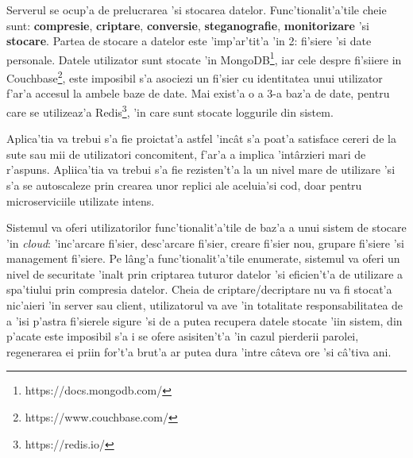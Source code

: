 \documentclass[12pt,a4paper,twoside]{report}
\begin{document}
Serverul se ocup'a de prelucrarea 'si stocarea datelor. Func'tionalit'a'tile cheie sunt: \textbf{compresie}, \textbf{criptare}, \textbf{conversie}, \textbf{steganografie}, \textbf{monitorizare} 'si \textbf{stocare}. Partea de stocare a datelor este 'imp'ar'tit'a 'in 2: fi'siere 'si date personale. Datele utilizator sunt stocate 'in MongoDB\footnote{https://docs.mongodb.com/}, iar cele despre fi'siiere in Couchbase\footnote{https://www.couchbase.com/}, este imposibil s'a asociezi un fi'sier cu identitatea unui utilizator f'ar'a accesul la ambele baze de date. Mai exist'a o a 3-a baz'a de date, pentru care se utilizeaz'a Redis\footnote{https://redis.io/}, 'in care sunt stocate loggurile din sistem.

Aplica'tia  va trebui s'a fie proictat'a  astfel 'incât s'a poat'a satisface cereri de la sute sau mii de utilizatori concomitent, f'ar'a a implica 'intârzieri mari de r'aspuns. Apliica'tia va trebui s'a fie rezisten't'a la un nivel mare de utilizare 'si s'a se autoscaleze prin crearea unor replici ale aceluia'si cod, doar pentru microserviciile utilizate intens.

Sistemul va oferi utilizatorilor func'tionalit'a'tile de baz'a a unui sistem de stocare 'in \textit{cloud}: 'inc'arcare fi'sier, desc'arcare fi'sier, creare fi'sier nou, grupare fi'siere 'si management fi'siere. Pe lâng'a func'tionalit'a'tile enumerate, sistemul va oferi un nivel de securitate 'inalt prin criptarea tuturor datelor 'si eficien't'a de utilizare a spa'tiului prin compresia datelor. Cheia de criptare/decriptare nu va fi stocat'a nic'aieri 'in server sau client, utilizatorul va ave 'in totalitate responsabilitatea de a 'isi p'astra fi'sierele sigure 'si de a putea recupera datele stocate 'iin sistem, din p'acate este imposibil s'a i se ofere asisiten't'a 'in cazul pierderii parolei, regenerarea ei priin for't'a brut'a ar putea dura 'intre câteva ore 'si câ'tiva ani.
\end{document}
